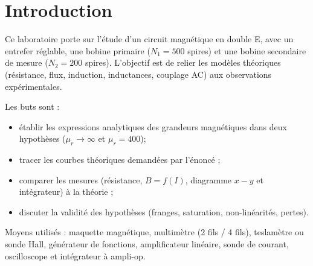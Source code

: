 \section{Introduction}

Ce laboratoire porte sur l'étude d'un circuit magnétique en double E, avec un entrefer réglable, une bobine primaire (\(N_1=500\) spires) et une bobine secondaire de mesure (\(N_2=200\) spires). L'objectif est de relier les modèles théoriques (résistance, flux, induction, inductances, couplage AC) aux observations expérimentales.

Les buts sont :
\begin{itemize}
\item établir les expressions analytiques des grandeurs magnétiques dans deux hypothèses (\(\mu_r\to\infty\) et \(\mu_r=400\));
\item tracer les courbes théoriques demandées par l'énoncé ;
\item comparer les mesures (résistance, \(B=f(I)\), diagramme \(x-y\) et intégrateur) à la théorie ;
\item discuter la validité des hypothèses (franges, saturation, non-linéarités, pertes).
\end{itemize}

Moyens utilisés : maquette magnétique, multimètre (2 fils / 4 fils), teslamètre ou sonde Hall, générateur de fonctions, amplificateur linéaire, sonde de courant, oscilloscope et intégrateur à ampli-op.
